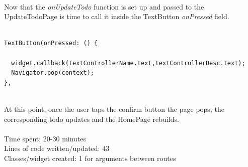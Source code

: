 \mbox{}\\
Now that the \textit{onUpdateTodo } function is set up and  passed to the UpdateTodoPage is  time to call it inside the TextButton \textit{onPressed  }field.
\mbox{}\\
\begin{code}

\label{code:2.43}
\begin{verbatim}

TextButton(onPressed: () {

  widget.callback(textControllerName.text,textControllerDesc.text);
  Navigator.pop(context);
},
\end{verbatim}
\end{code}
\mbox{}\\
At this point, once the user taps the confirm button the page pops, the corresponding todo updates and the HomePage rebuilds.\\
\\
Time spent: 20-30 minutes\\
Lines of code written/updated: 43\\ 
Classes/widget created: 1 for arguments between routes\\


